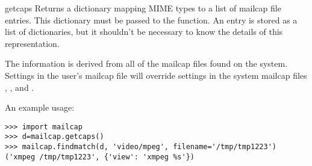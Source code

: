 \begin{funcdesc}{getcaps}{}
Returns a dictionary mapping MIME types to a list of mailcap file
entries. This dictionary must be passed to the 
function.  An entry is stored as a list of dictionaries, but it
shouldn't be necessary to know the details of this representation.

The information is derived from all of the mailcap files found on the
system. Settings in the user's mailcap file 
will override settings in the system mailcap files
, , and
.
\end{funcdesc}

An example usage:
\begin{verbatim}
>>> import mailcap
>>> d=mailcap.getcaps()
>>> mailcap.findmatch(d, 'video/mpeg', filename='/tmp/tmp1223')
('xmpeg /tmp/tmp1223', {'view': 'xmpeg %s'})
\end{verbatim}
